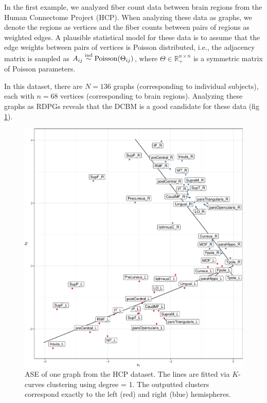 \documentclass[
  11pt,
]{article}
\begin{document}
In the first example, we analyzed fiber count data between brain regions
from the Human Connectome Project (HCP). When analyzing these data as
graphs, we denote the regions as vertices and the fiber counts between
pairs of regions as weighted edges. A plausible statistical model for
these data is to assume that the edge weights between pairs of vertices
is Poisson distributed, i.e., the adjacency matrix is sampled as
\(A_{ij} \stackrel{\mathrm{ind}}{\sim} \mathrm{Poisson}(\Theta_{ij})\), where
\(\Theta \in \mathbb{R}_+^{n \times n}\) is a symmetric matrix of
Poisson parameters.

In this dataset, there are \(N = 136\) graphs (corresponding to
individual subjects), each with \(n = 68\) vertices (corresponding to
brain regions). Analyzing these graphs as RDPGs reveals that the DCBM is
a good candidate for these data (fig \ref{fig:hcp-ase}).

\begin{figure}[H]

{\centering \includegraphics{draft_files/figure-latex/hcp-ase-1} 

}

\caption{ASE of one graph from the HCP dataset. The lines are fitted via $K$-curves clustering using degree = 1. The outputted clusters correspond exactly to the left (red) and right (blue) hemispheres.}\label{fig:hcp-ase}
\end{figure}
\end{document}
